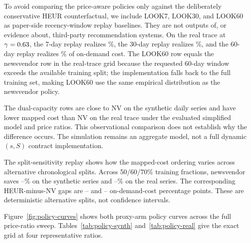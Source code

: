 \documentclass[11pt]{article}
\begin{document}
To avoid comparing the price-aware policies only against the deliberately
conservative HEUR counterfactual, we include LOOK7, LOOK30, and LOOK60 as
paper-side recency-window replay baselines. They are not outputs of, or
evidence about, third-party recommendation systems. On the real trace at
$\gamma=0.63$, the 7-day replay realizes \extPolPctLookSeven\%,
the 30-day replay realizes \extPolPctLookThirty\%, and the 60-day replay
realizes \extPolPctLookSixty\% of on-demand cost. The LOOK60 row equals the
newsvendor row in the real-trace grid because the requested 60-day window
exceeds the available training split; the implementation falls back to the
full training set, making LOOK60 use the same empirical distribution as the
newsvendor policy.

The dual-capacity rows are close to NV on the synthetic daily series and have
lower mapped cost than NV on the real trace under the evaluated simplified
model and price ratios. This observational comparison does not establish why
the difference occurs. The simulation remains an aggregate model, not a full
dynamic $(s,S)$ contract implementation.

The split-sensitivity replay shows how the mapped-cost ordering varies across
alternative chronological splits. Across 50/60/70\% training fractions,
newsvendor
saves \polNvSaveMin--\polNvSaveMax\% on the synthetic series and
\extPolNvSaveMin--\extPolNvSaveMax\% on the real series. The corresponding
HEUR-minus-NV gaps are \polPoCMin--\polPoCMax{} and
\extPolPoCMin--\extPolPoCMax{} on-demand-cost percentage points. These are
deterministic alternative splits, not confidence intervals.

Figure~\ref{fig:policy-curves} shows both proxy-arm policy curves
across the full price-ratio sweep. Tables~\ref{tab:policy-synth}
and~\ref{tab:policy-real} give the exact grid at four representative ratios.

\begin{table}[t]
\caption{Study III synthetic daily cost-proxy results as \% of the
on-demand-only baseline across the price-ratio grid. LOOK rows are paper-side
recency-window baselines.}
\label{tab:policy-synth}
\centering
\renewcommand{\arraystretch}{1.08}

\end{table}

\begin{table}[t]
\caption{Study III real-trace hourly CPU-demand-proxy results as \% of the
on-demand-only baseline across the price-ratio grid. LOOK60 degenerates to NV
because it uses the full training prefix.}
\label{tab:policy-real}
\centering
\renewcommand{\arraystretch}{1.08}

\end{table}
\end{document}
